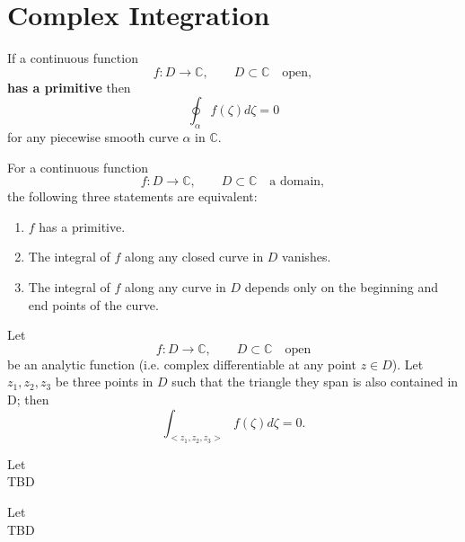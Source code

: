 \section{Complex Integration}


\begin{theorem}
    \label{sec:ClosedContourT}
    If a continuous function
    $$ f : D \rightarrow \mathbb{C}, \qquad D \subset \mathbb{C} \quad \text{open},$$
    \textbf{has a primitive} then
    $$\oint_\alpha f(\zeta)d\zeta = 0$$
    for any piecewise smooth curve $\alpha$ in $\mathbb{C}$.
\end{theorem}


\begin{theorem}
    \label{sec:MainTCalculus}
    For a continuous function
    $$ f : D \rightarrow \mathbb{C}, \qquad D \subset \mathbb{C} \quad \text{a domain},$$
    the following three statements are equivalent:
    \begin{enumerate}[label=\alph*)]
        \item $f$ has a primitive.
        \item The integral of $f$ along any closed curve in $D$ vanishes.
        \item The integral of $f$ along any curve in $D$ depends only on the beginning and end points of the curve.
    \end{enumerate}
\end{theorem}


\begin{theorem}
    \label{sec:CauchyITT}
    Let
    $$ f : D \rightarrow \mathbb{C}, \qquad D \subset \mathbb{C} \quad \text{open}$$
    be an analytic function (i.e. complex differentiable at any point $z \in D$). Let $z_1, z_2, z_3$ be three points
    in $D$ such that the triangle they span is also contained in D; then
    $$\int_{<z_1,z_2,z_3>} f(\zeta)d\zeta = 0.$$
\end{theorem}


\begin{theorem}
    \label{sec:CauchyITR}
    Let \\
    TBD
\end{theorem}


\begin{theorem}
    \label{sec:CauchyIF}
    Let \\
    TBD
\end{theorem}


